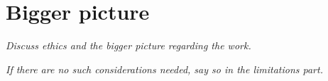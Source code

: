 
\section{Bigger picture}\label{sec:disc:big}

\textit{Discuss ethics and the bigger picture regarding the work.}

\textit{If there are no such considerations needed, say so in the limitations part.}

